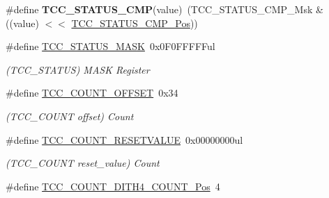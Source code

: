 \begin{DoxyCompactItemize}
\item 
\hypertarget{group___s_a_m_l21___t_c_c_gaf164bf5fde06f23cbb4d0996ceec6f98}{}\#define {\bfseries T\+C\+C\+\_\+\+S\+T\+A\+T\+U\+S\+\_\+\+C\+M\+P}(value)~(T\+C\+C\+\_\+\+S\+T\+A\+T\+U\+S\+\_\+\+C\+M\+P\+\_\+\+Msk \& ((value) $<$$<$ \hyperlink{group___s_a_m_l21___t_c_c_ga2ee88bac67f161f5c938354bdb3fbce1}{T\+C\+C\+\_\+\+S\+T\+A\+T\+U\+S\+\_\+\+C\+M\+P\+\_\+\+Pos}))\label{group___s_a_m_l21___t_c_c_gaf164bf5fde06f23cbb4d0996ceec6f98}

\item 
\hypertarget{group___s_a_m_l21___t_c_c_ga1895025d006d166f93087e36165a0f2e}{}\#define \hyperlink{group___s_a_m_l21___t_c_c_ga1895025d006d166f93087e36165a0f2e}{T\+C\+C\+\_\+\+S\+T\+A\+T\+U\+S\+\_\+\+M\+A\+S\+K}~0x0\+F0\+F\+F\+F\+F\+Ful\label{group___s_a_m_l21___t_c_c_ga1895025d006d166f93087e36165a0f2e}

\begin{DoxyCompactList}\small\item\em (T\+C\+C\+\_\+\+S\+T\+A\+T\+U\+S) M\+A\+S\+K Register \end{DoxyCompactList}\item 
\hypertarget{group___s_a_m_l21___t_c_c_ga603b9e009149179eef22fe890e4e32ab}{}\#define \hyperlink{group___s_a_m_l21___t_c_c_ga603b9e009149179eef22fe890e4e32ab}{T\+C\+C\+\_\+\+C\+O\+U\+N\+T\+\_\+\+O\+F\+F\+S\+E\+T}~0x34\label{group___s_a_m_l21___t_c_c_ga603b9e009149179eef22fe890e4e32ab}

\begin{DoxyCompactList}\small\item\em (T\+C\+C\+\_\+\+C\+O\+U\+N\+T offset) Count \end{DoxyCompactList}\item 
\hypertarget{group___s_a_m_l21___t_c_c_gaef1ffa16e19aeddc3284ace6db7a9faa}{}\#define \hyperlink{group___s_a_m_l21___t_c_c_gaef1ffa16e19aeddc3284ace6db7a9faa}{T\+C\+C\+\_\+\+C\+O\+U\+N\+T\+\_\+\+R\+E\+S\+E\+T\+V\+A\+L\+U\+E}~0x00000000ul\label{group___s_a_m_l21___t_c_c_gaef1ffa16e19aeddc3284ace6db7a9faa}

\begin{DoxyCompactList}\small\item\em (T\+C\+C\+\_\+\+C\+O\+U\+N\+T reset\+\_\+value) Count \end{DoxyCompactList}\item 
\hypertarget{group___s_a_m_l21___t_c_c_ga3adcc954f8f4dfa8572a5ac51ce33771}{}\#define \hyperlink{group___s_a_m_l21___t_c_c_ga3adcc954f8f4dfa8572a5ac51ce33771}{T\+C\+C\+\_\+\+C\+O\+U\+N\+T\+\_\+\+D\+I\+T\+H4\+\_\+\+C\+O\+U\+N\+T\+\_\+\+Pos}~4\label{group___s_a_m_l21___t_c_c_ga3adcc954f8f4dfa8572a5ac51ce33771}


\end{DoxyCompactItemize}
